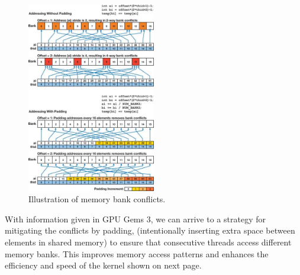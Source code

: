 \documentclass[10pt]{article}
\begin{document}
\begin{figure}[h]
\centering
\includegraphics[width=0.5\textwidth]{images/mbk.jpg}
\caption{Illustration of memory bank conflicts.}
\label{fig:mbk}
\end{figure}

\vspace{1cm}

With information given in GPU Gems 3, we can arrive to a strategy for mitigating the conflicts by padding, (intentionally inserting extra space between elements in shared memory) to ensure that consecutive threads access different memory banks. This improves memory access patterns and enhances the efficiency and speed of the kernel shown on next page. 

\pagebreak
\end{document}
